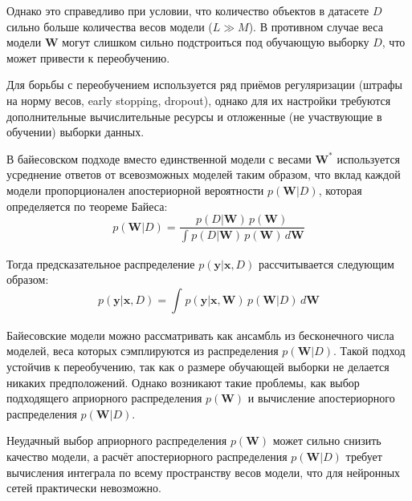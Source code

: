 \documentclass{article}
\numberwithin{equation}{section}
\begin{document}
    Однако это справедливо при условии, что количество объектов в датасете $D$
    сильно больше количества весов модели ($L \gg M$).
    В противном случае веса модели $\pmb{W}$ могут слишком сильно подстроиться
    под обучающую выборку $D$, что может привести к переобучению.

    Для борьбы с переобучением используется ряд приёмов регуляризации
    (штрафы на норму весов, early stopping, dropout),
    однако для их настройки требуются дополнительные вычислительные ресурсы
    и отложенные (не участвующие в обучении) выборки данных.

    В байесовском подходе вместо единственной модели с весами $\pmb{W}^*$
    используется усреднение ответов от всевозможных моделей таким образом,
    что вклад каждой модели пропорционален апостериорной вероятности $p(\pmb{W}| D)$,
    которая определяется по теореме Байеса:
    \begin{equation}
        p(\pmb{W}| D)
        =
        \frac
            {
                p(D | \pmb{W})
                \,
                p(\pmb{W})
            }
            {
                \int_{}{
                    p(D | \pmb{W})
                    \,
                    p(\pmb{W})
                    \,
                    d\pmb{W}
                }
            }
    \end{equation}

    Тогда предсказательное распределение $p(\pmb{y} | \pmb{x}, D)$ рассчитывается следующим образом:
    \begin{equation}
        p(\pmb{y} | \pmb{x}, D)
        =
        \int_{}{
            p(\pmb{y} | \pmb{x}, \pmb{W})
            \,
            p(\pmb{W} | D)
            \,
            d\pmb{W}
        }
    \end{equation}

    Байесовские модели можно рассматривать как ансамбль из бесконечного числа моделей,
    веса которых сэмплируются из распределения
    $p(\pmb{W}| D)$.
    Такой подход устойчив к переобучению, так как о размере обучающей выборки не делается никаких предположений.
    Однако возникают такие проблемы, как выбор подходящего априорного распределения
    $p(\pmb{W})$
    и вычисление апостериорного распределения
    $p(\pmb{W}| D)$.

    Неудачный выбор априорного распределения $p(\pmb{W})$ может сильно снизить качество модели,
    а расчёт апостериорного распределения $p(\pmb{W}| D)$
    требует вычисления интеграла по всему пространству весов модели,
    что для нейронных сетей практически невозможно.
\end{document}
